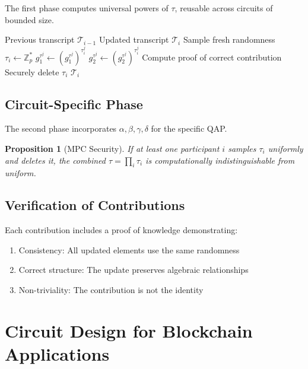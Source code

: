\documentclass[11pt,a4paper]{article}
\newtheorem{proposition}[theorem]{Proposition}
\newcommand{\Z}{\mathbb{Z}}
\begin{document}
The first phase computes universal powers of $\tau$, reusable across circuits of bounded size.

\begin{algorithm}
\caption{Powers of Tau Contribution}
\label{alg:pot}
\begin{algorithmic}[1]
\Require Previous transcript $\mathcal{T}_{i-1}$
\Ensure Updated transcript $\mathcal{T}_i$
\State Sample fresh randomness $\tau_i \gets \Z_p^*$
    \State $g_1^{\tau^j} \gets (g_1^{\tau^j})^{\tau_i^j}$ 
    \State $g_2^{\tau^j} \gets (g_2^{\tau^j})^{\tau_i^j}$
\EndFor
\State Compute proof of correct contribution
\State Securely delete $\tau_i$
\State \Return $\mathcal{T}_i$
\end{algorithmic}
\end{algorithm}

\subsection{Circuit-Specific Phase}

The second phase incorporates $\alpha, \beta, \gamma, \delta$ for the specific QAP.

\begin{proposition}[MPC Security]
If at least one participant $i$ samples $\tau_i$ uniformly and deletes it, the combined $\tau = \prod_i \tau_i$ is computationally indistinguishable from uniform.
\end{proposition}

\subsection{Verification of Contributions}

Each contribution includes a proof of knowledge demonstrating:
\begin{enumerate}[label=(\roman*)]
    \item Consistency: All updated elements use the same randomness
    \item Correct structure: The update preserves algebraic relationships
    \item Non-triviality: The contribution is not the identity
\end{enumerate}

\section{Circuit Design for Blockchain Applications}
\label{sec:circuits}
\end{document}
